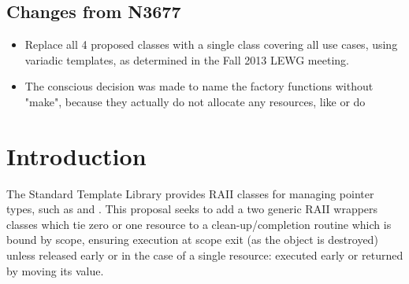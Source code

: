 \documentclass[ebook,11pt,article]{memoir}
\begin{document}
\section{Changes from N3677}
\begin{itemize}
\item Replace all 4 proposed classes with a single class covering all use cases, using variadic templates, as determined in the Fall 2013 LEWG meeting.
\item The conscious decision was made to name the factory functions without "make", because they actually do not allocate any resources, like  or  do
\end{itemize}

\chapter{Introduction}
The Standard Template Library provides RAII classes for managing pointer types, such as  and .  This proposal seeks to add a two generic RAII wrappers classes which tie zero or one resource to a clean-up/completion routine which is bound by scope, ensuring execution at scope exit (as the object is destroyed) unless released early or in the case of a single resource: executed early or returned by moving its value.
\end{document}

